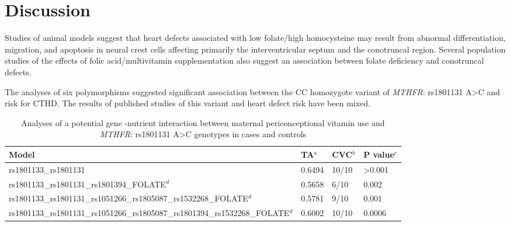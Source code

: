 \begin{refsection}
\begin{table}[tb]
\begin{tabular}{ p{1.5in} p{0.5in} p{0.5in} p{0.5in} p{0.5in} p{0.5in} p{0.5in} }
\end{tabular}
\end{table}

\section{Discussion}

Studies of animal models suggest that heart defects associated with low folate/high homocysteine may result from abnormal differentiation, migration, and apoptosis in neural crest cells affecting primarily the interventricular septum and the conotruncal region. Several population studies of the effects of folic acid/multivitamin supplementation also suggest an association between folate deficiency and conotruncal defects. 

The analyses of six polymorphisms suggested significant association between the CC homozygote variant of \textit{MTHFR}: rs1801131 A>C and risk for CTHD. The results of published studies of this variant and heart defect risk have been mixed.  


\begin{landscape}
\begin{table}[!p]
\centering
\caption{Analyses of a potential gene -nutrient interaction between maternal periconceptional vitamin use and \textit{MTHFR}: rs1801131 A>C genotypes in cases and controls}
\label{tab:6_11}
\begin{tabular}{ p{5.5in} P{1in} P{1in} P{1in} }
\toprule
	\textbf{Model} & \textbf{TA$^a$} & \textbf{CVC$^b$} &  \textbf{P value$^c$} \\ \toprule
	rs1801133\_rs1801131 & 0.6494 & 10/10 & >0.001 \\ \midrule
	rs1801133\_rs1801131\_rs1801394\_FOLATE$^d$ & 0.5658 & 6/10 & 0.002 \\ \midrule
	rs1801133\_rs1801131\_rs1051266\_rs1805087\_rs1532268\_FOLATE$^d$ & 0.5781 & 9/10 & 0.001 \\ \midrule
	rs1801133\_rs1801131\_rs1051266\_rs1805087\_rs1801394\_rs1532268\_FOLATE$^d$ & 0.6002 & 10/10 & 0.0006 \\ \bottomrule



\end{tabular}
\end{table}
\end{landscape}
\end{refsection}
